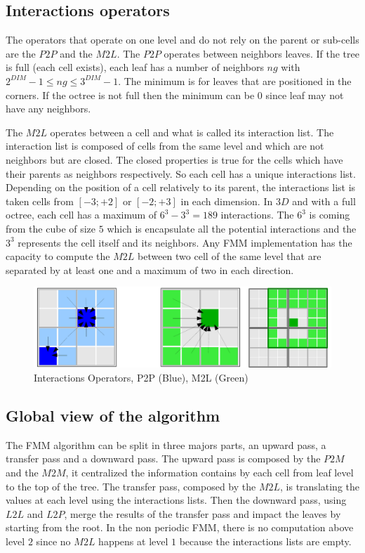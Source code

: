 \documentclass[12pt]{article} %
\begin{document}
\subsection{Interactions operators}
The operators that operate on one level and do not rely on the parent or sub-cells are the $P2P$ and the $M2L$.
The $P2P$ operates between neighbors leaves. If the tree is full (each cell exists), each leaf has a number of neighbors $ng$ with
$2^{DIM} - 1 \leq ng \leq 3^{DIM}-1$.
The minimum is for leaves that are positioned in the corners.
If the octree is not full then the minimum can be $0$ since leaf may not have any neighbors.

The $M2L$ operates between a cell and what is called its interaction list.
The interaction list is composed of cells from the same level and which are not neighbors but are closed.
The closed properties is true for the cells which have their parents as neighbors respectively.
So each cell has a unique interactions list.
Depending on the position of a cell relatively to its parent, the interactions list is taken cells from $[-3;+2]$ or $[-2;+3]$ in each dimension.
In $3D$ and with a full octree, each cell has a maximum of $6^3-3^3 = 189$ interactions.
The $6^3$ is coming from the cube of size $5$ which is encapsulate all the potential interactions and the $3^3$ represents the cell itself and its neighbors.
Any FMM implementation has the capacity to compute the $M2L$ between two cell of the same level that are separated by at least one and a maximum of two in each direction.

\begin{figure}[h]
\centering
\includegraphics[scale=0.6]{Images/InteractionsOperators}
\caption{Interactions Operators, P2P (Blue), M2L (Green)}
\end{figure}

\subsection{Global view of the algorithm}
The FMM algorithm can be split in three majors parts, an upward pass, a transfer pass and a downward pass.
The upward pass is composed by the $P2M$ and the $M2M$, it centralized the information contains by each cell from leaf level to the top of the tree.
The transfer pass, composed by the $M2L$, is translating the values at each level using the interactions lists.
Then the downward pass, using $L2L$ and $L2P$, merge the results of the transfer pass and impact the leaves by starting from the root.
In the non periodic FMM, there is no computation above level $2$ since no $M2L$ happens at level $1$ because the interactions lists are empty.
\end{document}
